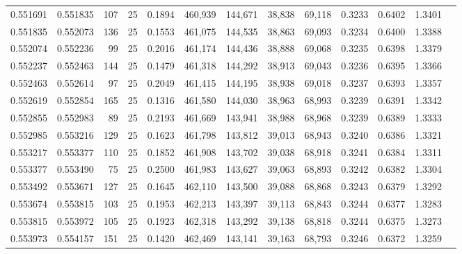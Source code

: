 \begin{tabular}{rrrrrrrrrrrrr}
0.551691 & 0.551835 &   107 &  25 &                                     0.1894 & 460,939 & 144,671 &  38,838 &  69,118 & 0.3233 & 0.6402 & 1.3401 \\
0.551835 & 0.552073 &   136 &  25 &                                     0.1553 & 461,075 & 144,535 &  38,863 &  69,093 & 0.3234 & 0.6400 & 1.3388 \\
0.552074 & 0.552236 &    99 &  25 &                                     0.2016 & 461,174 & 144,436 &  38,888 &  69,068 & 0.3235 & 0.6398 & 1.3379 \\
0.552237 & 0.552463 &   144 &  25 &                                     0.1479 & 461,318 & 144,292 &  38,913 &  69,043 & 0.3236 & 0.6395 & 1.3366 \\
0.552463 & 0.552614 &    97 &  25 &                                     0.2049 & 461,415 & 144,195 &  38,938 &  69,018 & 0.3237 & 0.6393 & 1.3357 \\
0.552619 & 0.552854 &   165 &  25 &                                     0.1316 & 461,580 & 144,030 &  38,963 &  68,993 & 0.3239 & 0.6391 & 1.3342 \\
0.552855 & 0.552983 &    89 &  25 &                                     0.2193 & 461,669 & 143,941 &  38,988 &  68,968 & 0.3239 & 0.6389 & 1.3333 \\
0.552985 & 0.553216 &   129 &  25 &                                     0.1623 & 461,798 & 143,812 &  39,013 &  68,943 & 0.3240 & 0.6386 & 1.3321 \\
0.553217 & 0.553377 &   110 &  25 &                                     0.1852 & 461,908 & 143,702 &  39,038 &  68,918 & 0.3241 & 0.6384 & 1.3311 \\
0.553377 & 0.553490 &    75 &  25 &                                     0.2500 & 461,983 & 143,627 &  39,063 &  68,893 & 0.3242 & 0.6382 & 1.3304 \\
0.553492 & 0.553671 &   127 &  25 &                                     0.1645 & 462,110 & 143,500 &  39,088 &  68,868 & 0.3243 & 0.6379 & 1.3292 \\
0.553674 & 0.553815 &   103 &  25 &                                     0.1953 & 462,213 & 143,397 &  39,113 &  68,843 & 0.3244 & 0.6377 & 1.3283 \\
0.553815 & 0.553972 &   105 &  25 &                                     0.1923 & 462,318 & 143,292 &  39,138 &  68,818 & 0.3244 & 0.6375 & 1.3273 \\
0.553973 & 0.554157 &   151 &  25 &                                     0.1420 & 462,469 & 143,141 &  39,163 &  68,793 & 0.3246 & 0.6372 & 1.3259 \\

\end{tabular}
